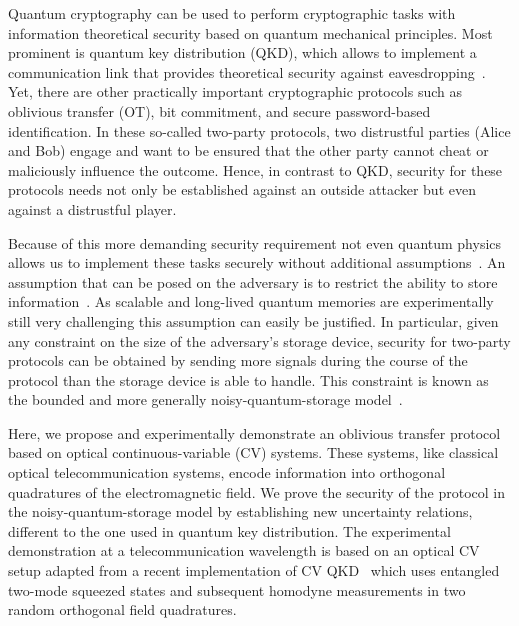 \documentclass[aps,amsfonts,twoside,amssymb,superscriptaddress,twocolumn]{revtex4-1}
\begin{document}
\maketitle
Quantum cryptography can be used to perform cryptographic tasks with information theoretical security based on quantum mechanical principles.
Most prominent is quantum key distribution (QKD), which allows to implement a communication link that provides theoretical security against eavesdropping~\cite{Wiesner83,Bennett84,Ekert91}. 
Yet, there are other practically important cryptographic protocols such as oblivious transfer (OT), bit commitment, and secure password-based identification. 
In these so-called two-party protocols, two distrustful parties (Alice and Bob) engage and want to be ensured that the other party cannot cheat or maliciously influence the outcome. 
Hence, in contrast to QKD, security for these protocols needs not only be established against an outside attacker but even against a distrustful player.

Because of this more demanding security requirement not even quantum physics allows us to implement these tasks securely without additional assumptions~\cite{mayers1997,mayerstrouble,lochaubitcom,lochaubitcom2,lo1997,kretch:bc,buhrman2012complete}. 
An assumption that can be posed on the adversary is to restrict the ability to store information~\cite{Maurer92b,cachin:bounded}.
As scalable and long-lived quantum memories are experimentally still very challenging this assumption can easily be justified.
In particular, given any constraint on the size of the adversary's storage device, security for two-party protocols can be obtained by sending more signals during the course of the protocol than the storage device is able to handle. 
This constraint is known as the bounded and more generally noisy-quantum-storage model~\cite{damgaard2008,damgaard2007,wehner2008}.


Here, we propose and experimentally demonstrate an oblivious transfer protocol based on optical continuous-variable (CV) systems.
These systems, like classical optical telecommunication systems, encode information into orthogonal quadratures of the electromagnetic field.
We prove the security of the protocol in the noisy-quantum-storage model by establishing new uncertainty relations, different to the one used in quantum key distribution. 
The experimental demonstration at a telecommunication wavelength is based on an optical CV setup adapted from a recent implementation of CV QKD~\cite{gehring2015CVQKD} which uses entangled two-mode squeezed states and subsequent homodyne measurements in two random orthogonal field quadratures.
\end{document}
